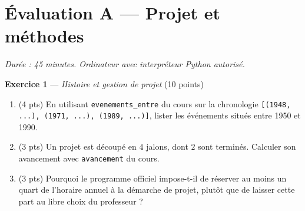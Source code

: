 \section*{Évaluation A --- Projet et méthodes}
\textit{Durée : 45 minutes. Ordinateur avec interpréteur Python autorisé.}


\bigskip

\textbf{Exercice 1} --- \textit{Histoire et gestion de projet} \hfill (10 points)

\begin{enumerate}
  \item (4 pts) En utilisant \lstinline{evenements_entre} du cours sur la chronologie \lstinline{[(1948, ...), (1971, ...), (1989, ...)]}, lister les événements situés entre 1950 et 1990.
  \item (3 pts) Un projet est découpé en $4$ jalons, dont $2$ sont terminés. Calculer son avancement avec \lstinline{avancement} du cours.
  \item (3 pts) Pourquoi le programme officiel impose-t-il de réserver au moins un quart de l'horaire annuel à la démarche de projet, plutôt que de laisser cette part au libre choix du professeur ?
\end{enumerate}


